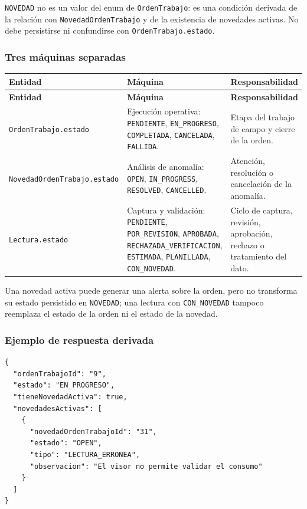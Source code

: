 \texttt{NOVEDAD} no es un valor del enum de \texttt{OrdenTrabajo}: es una condición derivada de la relación con \texttt{NovedadOrdenTrabajo} y de la existencia de novedades activas. No debe persistirse ni confundirse con \texttt{OrdenTrabajo.estado}.

\subsubsection{Tres máquinas separadas}

\begin{center}
\small
\begin{longtable}{|p{}|p{}|p{}|}
\hline
\textbf{Entidad} & \textbf{Máquina} & \textbf{Responsabilidad} \\
\hline
\endfirsthead
\hline
\textbf{Entidad} & \textbf{Máquina} & \textbf{Responsabilidad} \\
\hline
\endhead
\texttt{OrdenTrabajo.estado} & Ejecución operativa: \texttt{PENDIENTE}, \texttt{EN\_PROGRESO}, \texttt{COMPLETADA}, \texttt{CANCELADA}, \texttt{FALLIDA}. & Etapa del trabajo de campo y cierre de la orden. \\
\hline
\texttt{NovedadOrdenTrabajo.estado} & Análisis de anomalía: \texttt{OPEN}, \texttt{IN\_PROGRESS}, \texttt{RESOLVED}, \texttt{CANCELLED}. & Atención, resolución o cancelación de la anomalía. \\
\hline
\texttt{Lectura.estado} & Captura y validación: \texttt{PENDIENTE}, \texttt{POR\_REVISION}, \texttt{APROBADA}, \texttt{RECHAZADA\_VERIFICACION}, \texttt{ESTIMADA}, \texttt{PLANILLADA}, \texttt{CON\_NOVEDAD}. & Ciclo de captura, revisión, aprobación, rechazo o tratamiento del dato. \\
\hline
\end{longtable}
\end{center}

Una novedad activa puede generar una alerta sobre la orden, pero no transforma su estado persistido en \texttt{NOVEDAD}; una lectura con \texttt{CON\_NOVEDAD} tampoco reemplaza el estado de la orden ni el estado de la novedad.

\subsubsection{Ejemplo de respuesta derivada}

\begin{lstlisting}
{
  "ordenTrabajoId": "9",
  "estado": "EN_PROGRESO",
  "tieneNovedadActiva": true,
  "novedadesActivas": [
    {
      "novedadOrdenTrabajoId": "31",
      "estado": "OPEN",
      "tipo": "LECTURA_ERRONEA",
      "observacion": "El visor no permite validar el consumo"
    }
  ]
}
\end{lstlisting}

